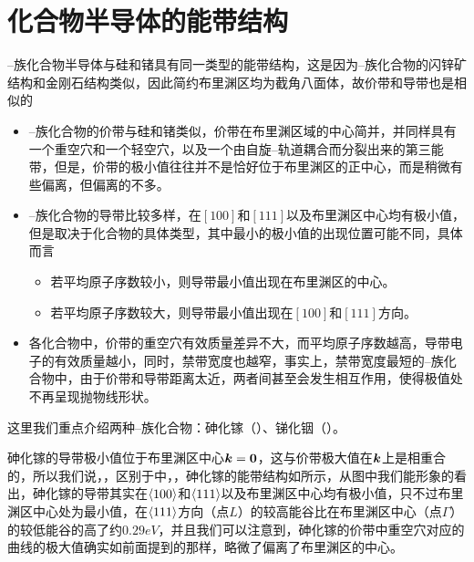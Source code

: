 \section{化合物半导体的能带结构}
--族化合物半导体与硅和锗具有同一类型的能带结构，这是因为--族化合物的闪锌矿结构和金刚石结构类似，因此简约布里渊区均为截角八面体，故价带和导带也是相似的
\begin{itemize}
    \item {}--族化合物的价带与硅和锗类似，价带在布里渊区域的中心简并，并同样具有一个重空穴和一个轻空穴，以及一个由自旋--轨道耦合而分裂出来的第三能带，但是，价带的极小值往往并不是恰好位于布里渊区的正中心，而是稍微有些偏离，但偏离的不多。
    \item {}--族化合物的导带比较多样，在$[100]$和$[111]$以及布里渊区中心均有极小值，但是取决于化合物的具体类型，其中最小的极小值的出现位置可能不同，具体而言
    \begin{itemize}
        \item 若平均原子序数较小，则导带最小值出现在布里渊区的中心。
        \item 若平均原子序数较大，则导带最小值出现在$[100]$和$[111]$方向。
    \end{itemize}
    \item 各化合物中，价带的重空穴有效质量差异不大，而平均原子序数越高，导带电子的有效质量越小，同时，禁带宽度也越窄，事实上，禁带宽度最短的--族化合物中，由于价带和导带距离太近，两者间甚至会发生相互作用，使得极值处不再呈现抛物线形状。
\end{itemize}

这里我们重点介绍两种--族化合物：砷化镓（）、锑化铟（）。

砷化镓的导带极小值位于布里渊区中心$\vb*{k}=\vb*{0}$，这与价带极大值在$\vb*{k}$上是相重合的，所以我们说，，区别于中，，砷化镓的能带结构如所示，从图中我们能形象的看出，砷化镓的导带其实在$\<100>$和$\<111>$以及布里渊区中心均有极小值，只不过布里渊区中心处为最小值，在$\<111>$方向（点$L$）的较高能谷比在布里渊区中心（点$\Gamma$）的较低能谷的高了约$0.29\si{eV}$，并且我们可以注意到，砷化镓的价带中重空穴对应的曲线的极大值确实如前面提到的那样，略微了偏离了布里渊区的中心。

